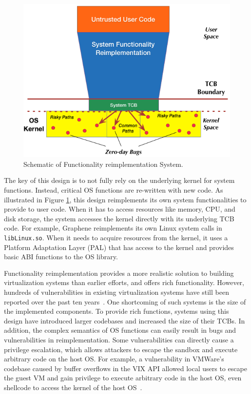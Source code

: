 \begin{figure}%
\centering
\includegraphics[width=1.0\columnwidth]{diagram/Virtualization_Design_Model_02.png}
\caption{\small Schematic of Functionality reimplementation System.}
\label{fig:design_functionality_reimplementation}
\end{figure}

The key of this design is to not fully rely on the underlying
kernel for system functions. Instead, critical OS functions are re-written with new
code. As illustrated in Figure \ref{fig:design_functionality_reimplementation}, 
this design reimplements its own system functionalities to provide to user code. 
When it has to %
access resources like memory, CPU, and disk storage, the system accesses the kernel directly with
its underlying TCB code. 
For example, Graphene \cite{Graphene-14} reimplements
its own Linux system calls in 
\texttt{libLinux.so}. When it needs to acquire resources from
the kernel, it uses a
Platform Adaptation Layer (PAL)  that has access to the kernel
and provides basic ABI functions to the OS library.

Functionality reimplementation provides a more realistic solution to building
virtualization systems than earlier efforts, and offers rich functionality.
However, hundreds of vulnerabilities in existing virtualization systems have still been
reported over the past ten years~\cite{NVD}. One shortcoming of such systems is the size
of the implemented components. To provide rich functions, systems using this design have
introduced larger codebases and increased the size of their TCBs. In addition, the
complex semantics of OS functions can easily result in bugs and vulnerabilities in
reimplementation. Some vulnerabilities
can directly cause a privilege escalation, which allows attackers to escape the sandbox
and execute arbitrary code on the host OS. 
For example, a vulnerability in VMWare's codebase caused by buffer overflows in the VIX
API allowed local users to escape the guest VM and 
gain privilege to execute arbitrary code in the host
OS, even shellcode to access the kernel of the host OS~\cite{CVE-2008-2100}. 

